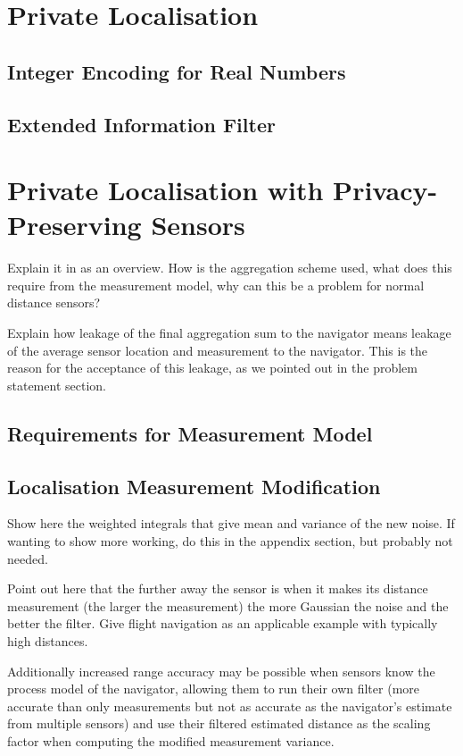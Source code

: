 \documentclass[twocolumn]{autart}    %
\begin{document}
\section{Private Localisation}

\subsection{Integer Encoding for Real Numbers}

\subsection{Extended Information Filter}


\section{Private Localisation with Privacy-Preserving Sensors} \label{sec:private_localisation}
Explain it in as an overview. How is the aggregation scheme used, what does this require from the measurement model, why can this be a problem for normal distance sensors?

Explain how leakage of the final aggregation sum to the navigator means leakage of the average sensor location and measurement to the navigator. This is the reason for the acceptance of this leakage, as we pointed out in the problem statement section.

\subsection{Requirements for Measurement Model}

\subsection{Localisation Measurement Modification}
Show here the weighted integrals that give mean and variance of the new noise. If wanting to show more working, do this in the appendix section, but probably not needed.

Point out here that the further away the sensor is when it makes its distance measurement (the larger the measurement) the more Gaussian the noise and the better the filter. Give flight navigation as an applicable example with typically high distances.

Additionally increased range accuracy may be possible when sensors know the process model of the navigator, allowing them to run their own filter (more accurate than only measurements but not as accurate as the navigator's estimate from multiple sensors) and use their filtered estimated distance as the scaling factor when computing the modified measurement variance.
\end{document}
